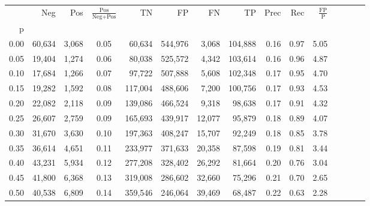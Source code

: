 \begin{tabular}{rrrcrrrrrrrrrrr}
\toprule
{} &     Neg &     Pos & $\frac{\text{Pos}}{\text{Neg}+\text{Pos}}$ &       TN &       FP &       FN &       TP &  Prec &   Rec & $\frac{\text{FP}}{\text{P}}$ \\
p    &         &         &                                            &          &          &          &          &       &       &                              \\
\midrule
0.00 &  60,634 &   3,068 &                                       0.05 &   60,634 &  544,976 &    3,068 &  104,888 &  0.16 &  0.97 &                         5.05 \\
0.05 &  19,404 &   1,274 &                                       0.06 &   80,038 &  525,572 &    4,342 &  103,614 &  0.16 &  0.96 &                         4.87 \\
0.10 &  17,684 &   1,266 &                                       0.07 &   97,722 &  507,888 &    5,608 &  102,348 &  0.17 &  0.95 &                         4.70 \\
0.15 &  19,282 &   1,592 &                                       0.08 &  117,004 &  488,606 &    7,200 &  100,756 &  0.17 &  0.93 &                         4.53 \\
0.20 &  22,082 &   2,118 &                                       0.09 &  139,086 &  466,524 &    9,318 &   98,638 &  0.17 &  0.91 &                         4.32 \\
0.25 &  26,607 &   2,759 &                                       0.09 &  165,693 &  439,917 &   12,077 &   95,879 &  0.18 &  0.89 &                         4.07 \\
0.30 &  31,670 &   3,630 &                                       0.10 &  197,363 &  408,247 &   15,707 &   92,249 &  0.18 &  0.85 &                         3.78 \\
0.35 &  36,614 &   4,651 &                                       0.11 &  233,977 &  371,633 &   20,358 &   87,598 &  0.19 &  0.81 &                         3.44 \\
0.40 &  43,231 &   5,934 &                                       0.12 &  277,208 &  328,402 &   26,292 &   81,664 &  0.20 &  0.76 &                         3.04 \\
0.45 &  41,800 &   6,368 &                                       0.13 &  319,008 &  286,602 &   32,660 &   75,296 &  0.21 &  0.70 &                         2.65 \\
0.50 &  40,538 &   6,809 &                                       0.14 &  359,546 &  246,064 &   39,469 &   68,487 &  0.22 &  0.63 &                         2.28 \\

\end{tabular}
